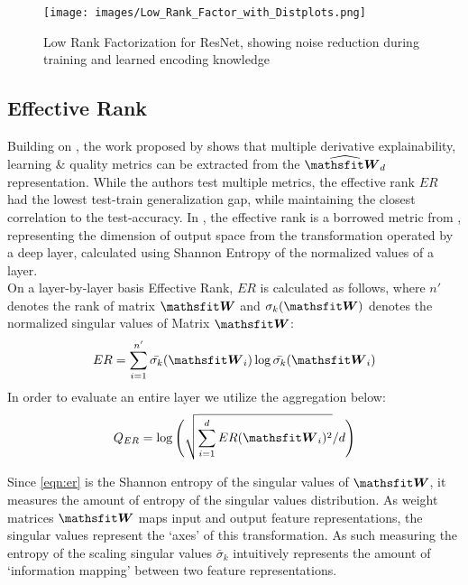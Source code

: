 \begin{figure}[htp]
    \centering
    \texttt{[image: images/Low\_Rank\_Factor\_with\_Distplots.png]}
    \caption{Low Rank Factorization for ResNet, showing noise reduction during training and learned encoding knowledge}
    \label{fig:lowrankdist}
\end{figure}

\subsection{Effective Rank}\label{sec:er}
Building on \cite{fu2021conet}, the work proposed by \cite{jaegerman21genprob} shows that multiple derivative explainability, learning \& quality metrics can be extracted from the $\widehat{\tW_d}$ representation. While the authors test multiple metrics, the effective rank $ER$ had the lowest test-train generalization gap, while maintaining the closest correlation to the test-accuracy. In \cite{jaegerman21genprob}, the effective rank is a borrowed metric from \cite{roy2007effective}, representing the dimension of output space from the transformation operated by a deep layer, calculated using Shannon Entropy of the normalized values of a layer. \\

On a layer-by-layer basis Effective Rank, $ER$ is calculated as follows, where $n'$ denotes the rank of matrix $\tW$ and $\sigma_k (\tW)$ denotes the normalized singular values of Matrix $\tW$:
\begin{equation} \label{eqn:er}
    ER = \sum_{i=1}^{n'} \bar{\sigma_k}(\tW_i) \log \bar{\sigma_k}(\tW_i)
\end{equation}
In order to evaluate an entire layer we utilize the aggregation below:
\begin{equation}\label{eqn:modeler}
    Q_{ER} = \log \Bigg( \sqrt{\sum_{i=1}^d ER(\tW_i)^2 } /d \Bigg)
\end{equation}

Since  \autoref{eqn:er} is the Shannon entropy of the singular values of $\tW$, it measures the amount of entropy of the singular values distribution. As weight matrices $\tW$ maps input and output feature representations, the singular values represent the `axes' of this transformation. As such measuring the entropy of the scaling singular values $\bar\sigma_k$ intuitively represents the amount of `information mapping' between two feature representations.
 
